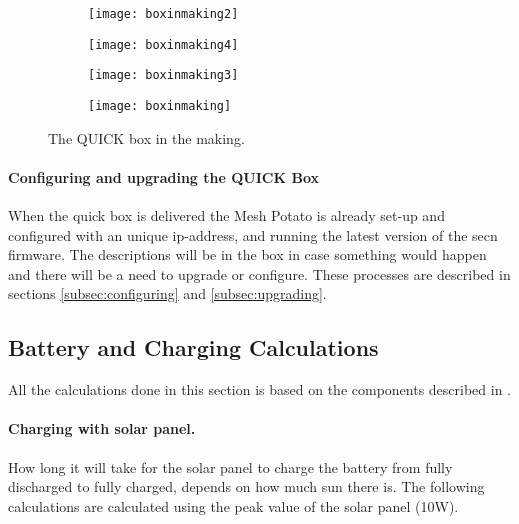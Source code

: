 \begin{figure}
        \centering
        \begin{subfigure}[t]{0.4\textwidth}
                \texttt{[image: boxinmaking2]}
                \label{fig:boxinmaking2}
        \end{subfigure}
        \begin{subfigure}[t]{0.4\textwidth}
                \texttt{[image: boxinmaking4]}
                \label{fig:boxinmaking}
        \end{subfigure}
         \begin{subfigure}[t]{0.3\textwidth}
                \texttt{[image: boxinmaking3]} 
                \label{fig:boxinmaking3}
        \end{subfigure}
        \begin{subfigure}[t]{0.4\textwidth}
                \texttt{[image: boxinmaking]} 
                \label{fig:boxinmaking4}
        \end{subfigure}
\caption{The QUICK box in the making.} \label{fig:boxinmaking}
\end{figure}

\paragraph{Configuring and upgrading the QUICK Box}
When the \gls{quick} box is delivered the Mesh Potato is already set-up and configured with an unique \gls{ip}-address, and running the latest version of the \gls{secn} firmware. The descriptions will be in the box in case something would happen and there will be a need to upgrade or configure. These processes are described in sections \ref{subsec:configuring} and \ref{subsec:upgrading}.

\subsection{Battery and Charging Calculations}
All the calculations done in this section is based on the components described in . 

\paragraph{Charging with solar panel.}
How long it will take for the solar panel to charge the battery from fully discharged to fully charged, depends on how much sun there is. The following calculations are calculated using the peak value of the solar panel (10W). 

